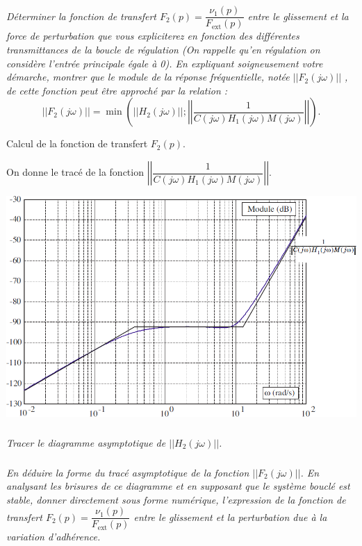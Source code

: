 \documentclass[10pt,fleqn]{article} %
\begin{document}
\begin{multicols}{2}
\subparagraph{}\textit{Déterminer la fonction de transfert $F_2(p)=\dfrac{\nu_1(p)}{F_{\text{ext}}(p)}$ entre le glissement et la force de perturbation que vous expliciterez en fonction des différentes
transmittances de la boucle de régulation (On rappelle qu'en régulation on considère l'entrée principale égale à 0). En expliquant soigneusement
votre démarche, montrer que le module de la réponse fréquentielle, notée $\left|\left| F_2\left(j\omega\right) \right|\right| $ , de cette fonction peut être approché par la relation : }
$$
||F_2 \left(j \omega\right) || = 
\min \left(
||H_2\left(j \omega\right)||; 
\left|\left| \dfrac{1}{C\left(j \omega\right)H_1\left(j \omega\right)M\left(j \omega\right)}\right|\right|\right).
$$


\begin{obj}
Calcul de la fonction de transfert $F_2(p)$.
\end{obj}
On donne le tracé de la fonction $\left|\left| \dfrac{1}{C\left(j \omega\right)H_1\left(j \omega\right)M\left(j \omega\right)}\right|\right|$. 

\begin{center}
\includegraphics[width=\linewidth]{images/fig_06}
\end{center}

\subparagraph{}\textit{Tracer le diagramme asymptotique de $\left|\left| H_2 \left(  j\omega \right)\right|\right|$.}

\subparagraph{}\textit{En déduire la forme du tracé asymptotique de la fonction $\left|\left| F_2 \left(  j\omega \right)\right|\right|$. En analysant
les brisures de ce diagramme et en supposant que le système bouclé est
stable, donner directement sous forme numérique, l’expression de la fonction de
transfert $F_2(p)=\dfrac{\nu_1(p)}{F_{\text{ext}}(p)}$ entre le glissement et la perturbation due à la
variation d’adhérence.}


\end{multicols}
\end{document}
